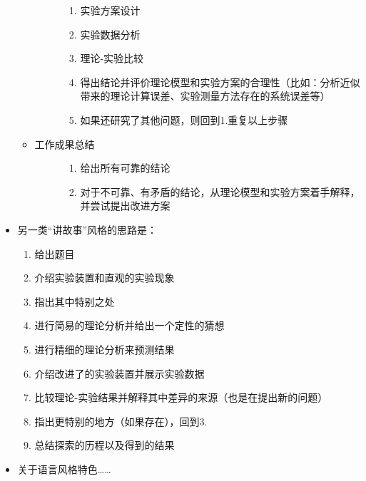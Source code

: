 \documentclass[a4paper,10pt,english]{sphinxmanual}
\begin{document}
\begin{itemize}
\begin{itemize}
\begin{description}
\begin{enumerate}
\item {} 
实验方案设计

\item {} 
实验数据分析

\item {} 
理论-实验比较

\item {} 
得出结论并评价理论模型和实验方案的合理性（比如：分析近似带来的理论计算误差、实验测量方法存在的系统误差等）

\item {} 
如果还研究了其他问题，则回到1.重复以上步骤

\end{enumerate}

\end{description}

\item {} \begin{description}
\item[{工作成果总结}] \leavevmode\begin{enumerate}
\item {} 
给出所有可靠的结论

\item {} 
对于不可靠、有矛盾的结论，从理论模型和实验方案着手解释，并尝试提出改进方案

\end{enumerate}

\end{description}

\end{itemize}

\item {} 
另一类“讲故事”风格的思路是：
\begin{enumerate}
\item {} 
给出题目

\item {} 
介绍实验装置和直观的实验现象

\item {} 
指出其中特别之处

\item {} 
进行简易的理论分析并给出一个定性的猜想

\item {} 
进行精细的理论分析来预测结果

\item {} 
介绍改进了的实验装置并展示实验数据

\item {} 
比较理论-实验结果并解释其中差异的来源（也是在提出新的问题）

\item {} 
指出更特别的地方（如果存在），回到3.

\item {} 
总结探索的历程以及得到的结果

\end{enumerate}

\item {} 
关于语言风格特色……

\end{itemize}
\end{document}
